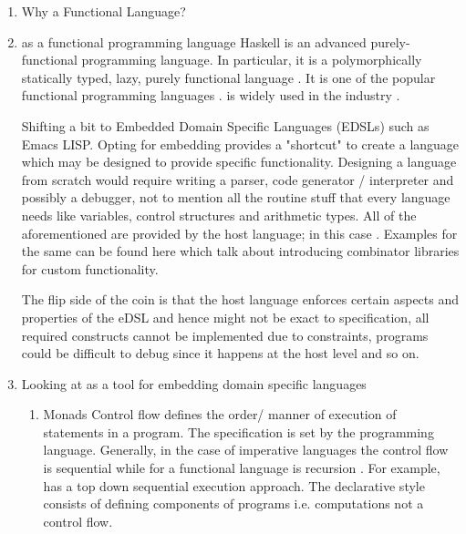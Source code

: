 \documentclass[thesis-solanki.tex]{subfiles}
\begin{document}
\begin{enumerate}

\item Why a Functional Language?

\item {} as a functional programming language
Haskell is an advanced purely-functional programming language. In particular, it is a polymorphically statically typed, lazy, purely 
functional language \cite{website:haskellwiki}. It is one of the popular functional programming languages \cite{website:langpop}. 
 is widely used in the industry \cite{website:haskellinindustry}. 

Shifting a bit to Embedded Domain Specific Languages (EDSLs) such as Emacs LISP. Opting for embedding provides a "shortcut" to create a 
language which may be designed to provide specific functionality. Designing a language from scratch would require writing a parser, code 
generator / interpreter and possibly a debugger, not to mention all the routine stuff that every language needs like variables, control 
structures and arithmetic types. All of the aforementioned are provided by the host language; in this case . Examples for 
the same can be found here \cite{jones2001composing, meyer2008eiffel} which talk about introducing combinator libraries for custom 
functionality.

The flip side of the coin is that the host language enforces certain aspects and properties of the eDSL and hence might not be exact to 
specification, all required constructs cannot be implemented due to constraints, programs could be difficult to debug since it happens at
the host level and so on.

\item Looking at  as a tool for embedding domain specific languages\cite{website:paulspontifications}

\begin{enumerate}
\item Monads
\newline  
Control flow defines the order/ manner of execution of statements in a pro\-gram\cite{website:controlflowwiki}. The specification is set by 
the programming language. Generally, in the case of imperative languages the control flow is sequential while for a functional language
is recursion \cite{website:controlflowdalhousie}. For example,  has a top down sequential execution approach. The 
declarative style consists of defining components of programs i.e. computations not a control 
flow\cite{website:declarativeprogrammingwiki}.     


\end{enumerate}
\end{enumerate}
\end{document}
